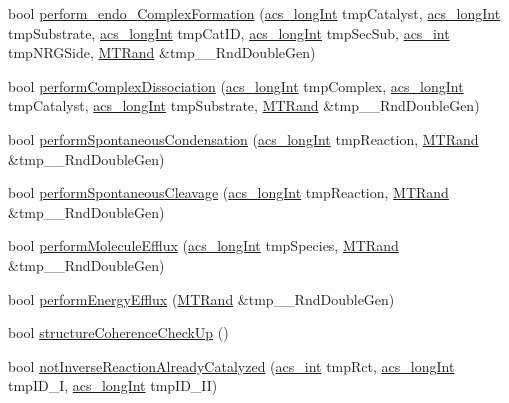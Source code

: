 \begin{DoxyCompactItemize}
\item 
bool \hyperlink{a00014_ae942db2453c56b60250a5d43452b91a5}{perform\-\_\-endo\-\_\-\-Complex\-Formation} (\hyperlink{a00050_a19319d75f02db4308bc5c0026d98cd85}{acs\-\_\-long\-Int} tmp\-Catalyst, \hyperlink{a00050_a19319d75f02db4308bc5c0026d98cd85}{acs\-\_\-long\-Int} tmp\-Substrate, \hyperlink{a00050_a19319d75f02db4308bc5c0026d98cd85}{acs\-\_\-long\-Int} tmp\-Cat\-I\-D, \hyperlink{a00050_a19319d75f02db4308bc5c0026d98cd85}{acs\-\_\-long\-Int} tmp\-Sec\-Sub, \hyperlink{a00050_a8d277355641a098190360234e2ebde35}{acs\-\_\-int} tmp\-N\-R\-G\-Side, \hyperlink{a00016}{M\-T\-Rand} \&tmp\-\_\-\-\_\-\-Rnd\-Double\-Gen)
\item 
bool \hyperlink{a00014_a5c5e57b0558067cbf55c894f33d0a121}{perform\-Complex\-Dissociation} (\hyperlink{a00050_a19319d75f02db4308bc5c0026d98cd85}{acs\-\_\-long\-Int} tmp\-Complex, \hyperlink{a00050_a19319d75f02db4308bc5c0026d98cd85}{acs\-\_\-long\-Int} tmp\-Catalyst, \hyperlink{a00050_a19319d75f02db4308bc5c0026d98cd85}{acs\-\_\-long\-Int} tmp\-Substrate, \hyperlink{a00016}{M\-T\-Rand} \&tmp\-\_\-\-\_\-\-Rnd\-Double\-Gen)
\item 
bool \hyperlink{a00014_acc764a05297ae00db52360f3df5ed1d5}{perform\-Spontaneous\-Condensation} (\hyperlink{a00050_a19319d75f02db4308bc5c0026d98cd85}{acs\-\_\-long\-Int} tmp\-Reaction, \hyperlink{a00016}{M\-T\-Rand} \&tmp\-\_\-\-\_\-\-Rnd\-Double\-Gen)
\item 
bool \hyperlink{a00014_a4949138a3771b7f6ec2bfe82cbad947e}{perform\-Spontaneous\-Cleavage} (\hyperlink{a00050_a19319d75f02db4308bc5c0026d98cd85}{acs\-\_\-long\-Int} tmp\-Reaction, \hyperlink{a00016}{M\-T\-Rand} \&tmp\-\_\-\-\_\-\-Rnd\-Double\-Gen)
\item 
bool \hyperlink{a00014_ad072a40a7d9521379c7ff50ed8110fbe}{perform\-Molecule\-Efflux} (\hyperlink{a00050_a19319d75f02db4308bc5c0026d98cd85}{acs\-\_\-long\-Int} tmp\-Species, \hyperlink{a00016}{M\-T\-Rand} \&tmp\-\_\-\-\_\-\-Rnd\-Double\-Gen)
\item 
bool \hyperlink{a00014_aff7607e0f3a74790109a7d87de3031bd}{perform\-Energy\-Efflux} (\hyperlink{a00016}{M\-T\-Rand} \&tmp\-\_\-\-\_\-\-Rnd\-Double\-Gen)
\item 
bool \hyperlink{a00014_a6606b08f25751a8796c13810962b385e}{structure\-Coherence\-Check\-Up} ()
\item 
bool \hyperlink{a00014_a5160dec152ed0369fe8af9aff3253a9e}{not\-Inverse\-Reaction\-Already\-Catalyzed} (\hyperlink{a00050_a8d277355641a098190360234e2ebde35}{acs\-\_\-int} tmp\-Rct, \hyperlink{a00050_a19319d75f02db4308bc5c0026d98cd85}{acs\-\_\-long\-Int} tmp\-I\-D\-\_\-\-I, \hyperlink{a00050_a19319d75f02db4308bc5c0026d98cd85}{acs\-\_\-long\-Int} tmp\-I\-D\-\_\-\-I\-I)

\end{DoxyCompactItemize}

